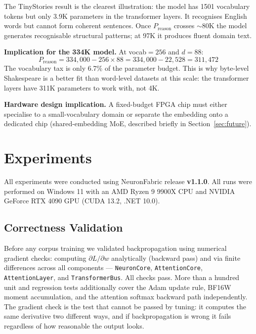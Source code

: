 \documentclass[11pt]{article}
\newcommand{\repoversion}{v1.1.0}
\begin{document}
The TinyStories result is the clearest illustration: the model has 1501 vocabulary
tokens but only 3.9K parameters in the transformer layers. It recognises English
words but cannot form coherent sentences. Once $P_{\text{reason}}$ crosses $\sim$80K
the model generates recognisable structural patterns; at 97K it produces fluent
domain text.

\textbf{Implication for the 334K model.} At vocab$=256$ and $d{=}88$:
\[
P_{\text{reason}} = 334{,}000 - 256 \times 88 = 334{,}000 - 22{,}528 = 311{,}472
\]
The vocabulary tax is only 6.7\% of the parameter budget. This is why byte-level
Shakespeare is a better fit than word-level datasets at this scale: the transformer
layers have 311K parameters to work with, not 4K.

\textbf{Hardware design implication.} A fixed-budget FPGA chip must either
specialise to a small-vocabulary domain or separate the embedding onto a dedicated
chip (shared-embedding MoE, described briefly in Section~\ref{sec:future}).

\section{Experiments}

\label{sec:experiments}

All experiments were conducted using NeuronFabric release \textbf{\repoversion}.
All runs were performed on Windows 11 with an AMD Ryzen 9 9900X CPU and NVIDIA GeForce RTX 4090 GPU (CUDA 13.2, .NET 10.0).

\subsection{Correctness Validation}

Before any corpus training we validated backpropagation using numerical gradient
checks: computing $\partial L / \partial w$ analytically (backward pass) and via
finite differences across all components --- \texttt{NeuronCore},
\texttt{AttentionCore}, \texttt{AttentionLayer}, and \texttt{TransformerBus}.
All checks pass. More than a hundred unit and regression tests additionally cover the Adam update rule, BF16W moment
accumulation, and the attention softmax backward path independently.
The gradient check is the test that cannot be passed by tuning: it computes the
same derivative two different ways, and if backpropagation is wrong it fails
regardless of how reasonable the output looks.
\end{document}
